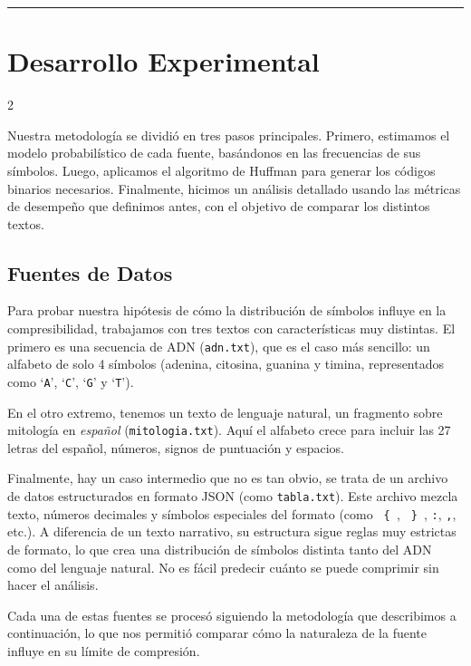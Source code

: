 \documentclass[a4paper, 10pt]{article}
\newcommand{\sectionrule}{\noindent\color{black!30}\rule{\linewidth}{0.6pt}}
\begin{document}
{\sectionrule}


\section{Desarrollo Experimental}

\begin{multicols}{2}
    
    Nuestra metodología se dividió en tres pasos principales. Primero, estimamos el modelo probabilístico de cada fuente, basándonos en las frecuencias de sus símbolos. Luego, aplicamos el algoritmo de Huffman para generar los códigos binarios necesarios. Finalmente, hicimos un análisis detallado usando las métricas de desempeño que definimos antes, con el objetivo de comparar los distintos textos.

    \subsection{Fuentes de Datos}

        Para probar nuestra hipótesis de cómo la distribución de símbolos influye en la compresibilidad, trabajamos con tres textos con características muy distintas. El primero es una secuencia de ADN (\texttt{adn.txt}), que es el caso más sencillo: un alfabeto de solo 4 símbolos (adenina, citosina, guanina y timina, representados como `\texttt{A}', `\texttt{C}', `\texttt{G}' y `\texttt{T}').

        En el otro extremo, tenemos un texto de lenguaje natural, un fragmento sobre mitología en \textit{español} (\texttt{mitologia.txt}). Aquí el alfabeto crece para incluir las 27 letras del español, números, signos de puntuación y espacios. 

        Finalmente, hay un caso intermedio que no es tan obvio, se trata de un archivo de datos estructurados en formato JSON (como \texttt{tabla.txt}). Este archivo mezcla texto, números decimales y símbolos especiales del formato (como \texttt{ \{ }, \texttt{ \} }, \texttt{:}, \texttt{,}, etc.). A diferencia de un texto narrativo, su estructura sigue reglas muy estrictas de formato, lo que crea una distribución de símbolos distinta tanto del ADN como del lenguaje natural. No es fácil predecir cuánto se puede comprimir sin hacer el análisis.

        Cada una de estas fuentes se procesó siguiendo la metodología que describimos a continuación, lo que nos permitió comparar cómo la naturaleza de la fuente influye en su límite de compresión.


\end{multicols}
\end{document}
